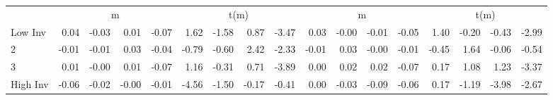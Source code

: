 \begin{table}[!ht]
\begin{tabular}{lrrrrrrrrrrrrrrrr}
  
    
      & \multicolumn{4}{c}{m} & \multicolumn{4}{c}{t(m)}
    
      & \multicolumn{4}{c}{m} & \multicolumn{4}{c}{t(m)}
    
    \\
      \cmidrule(r){2-5} \cmidrule(r){6-9} \cmidrule(r){10-13} \cmidrule(r){14-17}

    Low Inv   & 0.04  & -0.03  & 0.01  & -0.07  & 1.62  & -1.58  & 0.87  & -3.47  & 0.03  & -0.00  & -0.01  & -0.05  & 1.40  & -0.20  & -0.43  & -2.99  \\
           2  & -0.01  & -0.01  & 0.03  & -0.04  & -0.79  & -0.60  & 2.42  & -2.33  & -0.01  & 0.03  & -0.00  & -0.01  & -0.45  & 1.64  & -0.06  & -0.54  \\
           3  & 0.01  & -0.00  & 0.01  & -0.07  & 1.16  & -0.31  & 0.71  & -3.89  & 0.00  & 0.02  & 0.02  & -0.07  & 0.17  & 1.08  & 1.23  & -3.37  \\
    High Inv  & -0.06  & -0.02  & -0.00  & -0.01  & -4.56  & -1.50  & -0.17  & -0.41  & 0.00  & -0.03  & -0.09  & -0.06  & 0.17  & -1.19  & -3.98  & -2.67  \\

  

  \bottomrule
\end{tabular}
\label{tbl:32_Size_BM_Inv_C97}
\end{table}